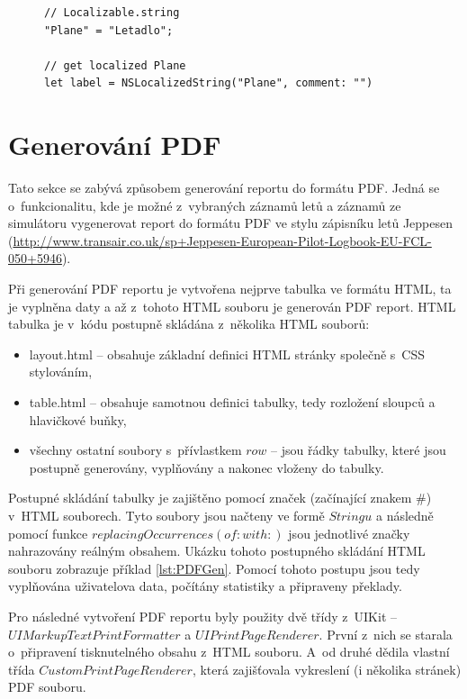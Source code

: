 \documentclass[thesis=M,czech]{FITthesis}[2012/06/26]
\begin{document}
\begin{figure}
\begin{minipage}{\linewidth}
\begin{lstlisting}[caption={Ukázka použití $Localizable.string$},label={lst:locString}]
// Localizable.string
"Plane" = "Letadlo";

// get localized Plane
let label = NSLocalizedString("Plane", comment: "")
\end{lstlisting}
\end{minipage}
\end{figure}

\section{Generování PDF}
Tato sekce se zabývá způsobem generování reportu do formátu PDF. Jedná se o~funkcionalitu, kde je možné z~vybraných záznamů letů a záznamů ze simulátoru vygenerovat report do formátu PDF ve stylu zápisníku letů Jeppesen (\url{http://www.transair.co.uk/sp+Jeppesen-European-Pilot-Logbook-EU-FCL-050+5946}).

Při generování PDF reportu je vytvořena nejprve tabulka ve formátu HTML, ta je vyplněna daty a až z~tohoto HTML souboru je generován PDF report. HTML tabulka je v~kódu postupně skládána z~několika HTML souborů:
\begin{itemize}
\item layout.html -- obsahuje základní definici HTML stránky společně s~CSS stylováním,
\item table.html -- obsahuje samotnou definici tabulky, tedy rozložení sloupců  a hlavičkové buňky,
\item všechny ostatní soubory s~přívlastkem $row$ -- jsou řádky tabulky, které jsou postupně generovány, vyplňovány a nakonec vloženy do tabulky.
\end{itemize}
Postupné skládání tabulky je zajištěno pomocí značek (začínající znakem \#) v~HTML souborech. Tyto soubory jsou načteny ve formě $Stringu$ a následně pomocí funkce $replacingOccurrences(of:with:)$ jsou jednotlivé značky nahrazovány reálným obsahem. Ukázku tohoto postupného skládání HTML souboru zobrazuje příklad \ref{lst:PDFGen}. Pomocí tohoto postupu jsou tedy vyplňována uživatelova data, počítány statistiky a připraveny překlady.

Pro následné vytvoření PDF reportu byly použity dvě třídy z~UIKit -- $UIMarkupTextPrintFormatter$ a $UIPrintPageRenderer$. První z~nich se starala o~připravení tisknutelného obsahu z~HTML souboru. A~od druhé dědila vlastní třída $CustomPrintPageRenderer$, která zajišťovala vykreslení (i několika stránek) PDF souboru.  
\end{document}
